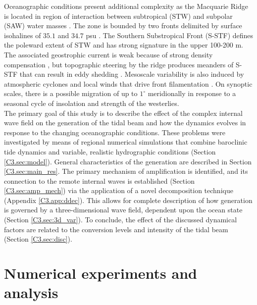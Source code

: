 \documentclass[12pt]{article}
\begin{document}
Oceanographic conditions present additional complexity as the Macquarie Ridge is located in region 
of interaction 
between 
subtropical (STW) and subpolar (SAW) water masses \citep{chiswell2015physical}. 
The zone is bounded by two fronts delimited by surface isohalines of $35.1$ and $34.7$ psu
\citep{belkin1996southern, hamilton2006structure} . The Southern 
Substropical Front 
(S-STF) defines the poleward extent of STW and has strong signature in the upper 100-200 m. The 
associated geostrophic current is weak because of strong density compensation 
\citep{graham2013dynamical}, but topographic 
steering by the ridge produces meanders of S-STF that can result in eddy shedding 
\citep{smith2013interaction}. Mesoscale variability is also induced by atmospheric cyclones and 
local winds that drive front filamentation \citep{james2002summer}. On synoptic scales, there is a 
possible 
migration of up to $1^{\circ}$ meridionally \citep{smith2017variability} in response to a seasonal 
cycle of 
insolation and strength of the westerlies.\\

The primary goal of this study is to describe the effect of the complex internal wave field on the 
generation of the tidal beam and how the dynamics evolves in response to the changing 
oceanographic conditions. These problems were investigated by means of regional numerical 
simulations that 
combine baroclinic tide dynamics and variable, realistic hydrographic conditions (Section 
\ref{C3.sec:model}). General 
characteristics of the generation are described in Section \ref{C3.sec:main_res}. The primary 
mechanism of 
amplification is identified, and its connection to the remote internal waves is established 
(Section \ref{C3.sec:amp_mech}) via the application of a novel decomposition technique (Appendix 
\ref{C3.app:ddec}). 
This allows for 
complete description of how generation is governed by a three-dimensional wave field, dependent 
upon 
the ocean state (Section \ref{C3.sec:3d_var}). To conclude, the effect of the discussed dynamical 
factors are related to the conversion levels and intensity of the tidal beam 
(Section \ref{C3.sec:disc}).\\
 
\newpage

\section{Numerical experiments and analysis}
\end{document}
